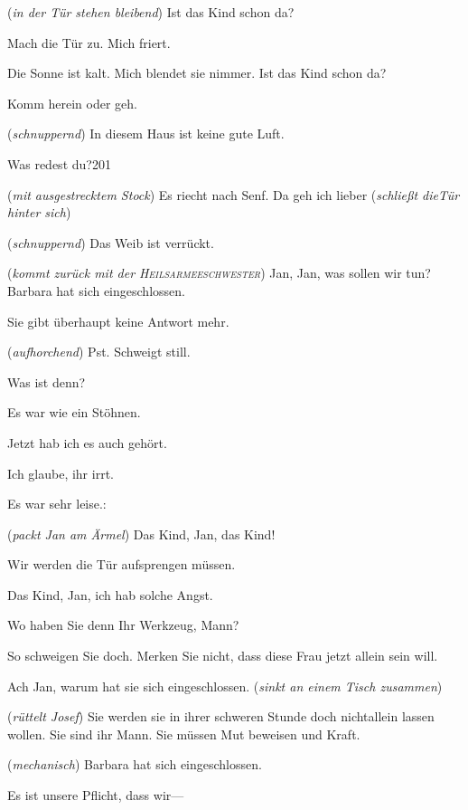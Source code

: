 \documentclass[
	final,
	a4paper,
	ngerman,
	mpinclude = true, %
	twoside = true,
	open = right,
	cleardoublepage = plain,
	DIV = 13,
	BCOR = 1cm,
	titlepage = firstiscover,
	]{scrbook}
\newcommand{\direction}[1]{(\textit{#1})}
\newcommand{\thecharacter}[1]{\textup{\textsc{#1}}\xspace}
\newcommand{\theJosef}{\thecharacter{Josef}}
\newcommand{\theKathrine}{\thecharacter{Kathrine}}
\newcommand{\theJan}{\thecharacter{Jan}}
\newcommand{\theHeilsarmeeschwester}{\thecharacter{Heilsarmeeschwester}}
\newcommand{\character}[1]{\item[#1]}
\newcommand{\Josef}{\character{\theJosef}}
\newcommand{\Kathrine}{\character{\theKathrine}}
\newcommand{\Jan}{\character{\theJan}}
\newcommand{\Heilsarmeeschwester}{\character{Schwester}}
\begin{document}
\begin{play}
\Kathrine
\direction{in der Tür stehen bleibend} Ist das Kind schon da?

\Jan
Mach die Tür zu. Mich friert.

\Kathrine
Die Sonne ist kalt. Mich blendet sie nimmer. Ist das Kind schon da?

\Jan
Komm herein oder geh.

\Kathrine
\direction{schnuppernd} In diesem Haus ist keine gute Luft.

\Jan
Was redest du?201

\Kathrine
\direction{mit ausgestrecktem Stock} Es riecht nach Senf. Da geh ich lieber \direction{schließt dieTür hinter sich}

\Jan
\direction{schnuppernd} Das Weib ist verrückt.

\Josef
\direction{kommt zurück mit der \theHeilsarmeeschwester} Jan, Jan, was sollen wir tun? Barbara hat sich eingeschlossen.

\Heilsarmeeschwester
Sie gibt überhaupt keine Antwort mehr.

\Jan
\direction{aufhorchend} Pst. Schweigt still.

\Heilsarmeeschwester
Was ist denn?

\Jan
Es war wie ein Stöhnen.

\Josef
Jetzt hab ich es auch gehört.

\Heilsarmeeschwester
Ich glaube, ihr irrt.

\Jan
Es war sehr leise.:

\Josef
\direction{packt Jan am Ärmel} Das Kind, Jan, das Kind!

\Heilsarmeeschwester
Wir werden die Tür aufsprengen müssen.

\Josef
Das Kind, Jan, ich hab solche Angst.

\Heilsarmeeschwester
Wo haben Sie denn Ihr Werkzeug, Mann?

\Jan
So schweigen Sie doch. Merken Sie nicht, dass diese Frau jetzt allein sein will.

\Josef
Ach Jan, warum hat sie sich eingeschlossen. \direction{sinkt an einem Tisch zusammen}

\Heilsarmeeschwester
\direction{rüttelt Josef} Sie werden sie in ihrer schweren Stunde doch nichtallein lassen wollen. Sie sind ihr Mann. Sie müssen Mut beweisen und Kraft.

\Josef
\direction{mechanisch} Barbara hat sich eingeschlossen.

\Heilsarmeeschwester
Es ist unsere Pflicht, dass wir---


\end{play}
\end{document}
